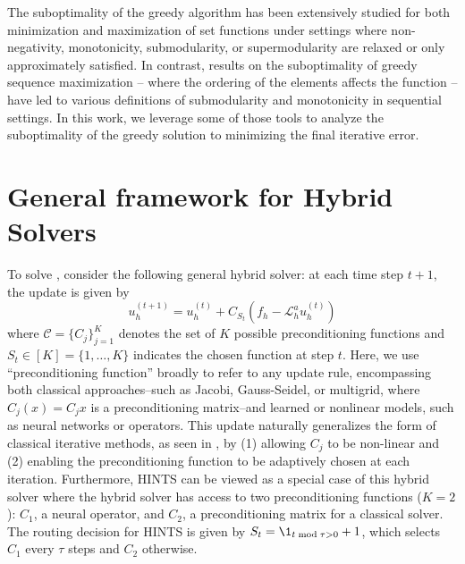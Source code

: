 \documentclass{article} %
\begin{document}
The suboptimality of the greedy algorithm has been extensively studied for both minimization \citep{bounia2023approximating}  and maximization \citep{das2018approximate,feige2011maximizing,bian2017guarantees,harshaw2019submodular} of set functions under settings where non-negativity, monotonicity, submodularity, or supermodularity are relaxed or only approximately satisfied. 
In contrast, results on the suboptimality of greedy sequence maximization \citep{streeter2008online,alaei2021maximizing,zhang2015string,bernardini2020through,van2024performance,tschiatschek2017selecting} -- where the ordering of the elements affects the function -- have led to various definitions of submodularity and monotonicity in sequential settings. In this work, we leverage some of those tools to analyze the suboptimality of the greedy solution to minimizing the final iterative error.


\section{General framework for Hybrid Solvers}


To solve , consider the following general hybrid solver: at each time step $t + 1$, the update is given by
\begin{equation}
     u^{\left(t + 1\right)}_h = u^{\left(t\right)}_h + C_{S_t}\left(f_h - \mathcal{L}_h^au^{\left(t \right)}_h\right)
\end{equation}
where $\mathcal{C} =\{C_{j}\}_{j = 1}^K$ denotes the set of $K$ possible preconditioning functions and $S_t \in [K] = \{1, \dots, K\}$ indicates the chosen function at step $t$. Here, we use ``preconditioning function'' broadly to refer to any update rule, encompassing both classical approaches--such as Jacobi, Gauss-Seidel, or multigrid, where $C_j(x) = C_jx$ is a preconditioning matrix--and learned or nonlinear models, such as neural networks or operators. 
This update naturally generalizes the form of classical iterative methods, as seen in , by (1) allowing $C_j$ to be non-linear and (2) 
enabling the preconditioning function to be adaptively chosen at each iteration. Furthermore, HINTS \citep{zhang2024blending} can be viewed as a special case of this hybrid solver where the hybrid solver has access to two preconditioning functions ($K = 2$):  $C_1$, a neural operator, and $C_2$, a preconditioning matrix for a classical solver. The routing decision for HINTS is given by $S_t = \1_{t \bmod \tau > 0} + 1$, which selects $C_1$ every $\tau$ steps and $C_2$ otherwise.
\end{document}
